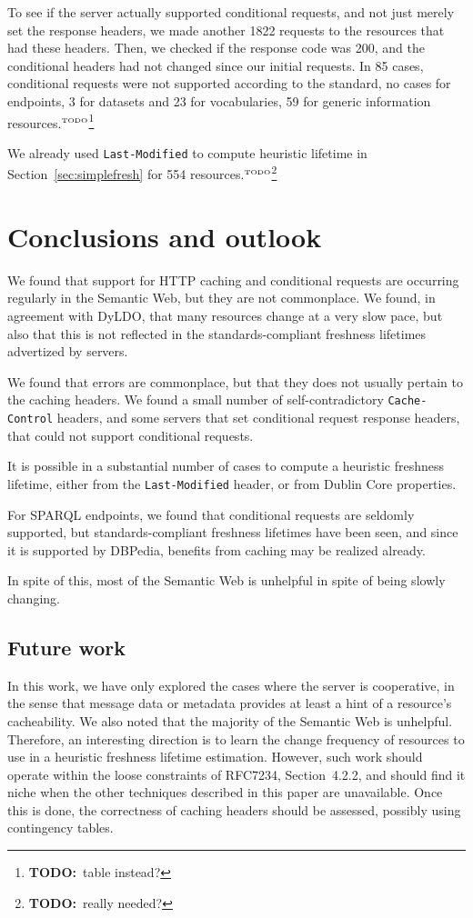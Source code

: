 \documentclass{llncs}
\newcommand{\httph}[1]{\texttt{#1}}
\newcommand{\todo}[1]{\ensuremath{^{\textrm{\tiny{TODO}\normalsize}}}\footnote{\textbf{TODO:}~#1}}
\begin{document}
To see if the server actually supported conditional requests, and not
just merely set the response headers, we made another 1822 requests to
the resources that had these headers. Then, we checked if the response
code was 200, and the conditional headers had not changed since our
initial requests. In 85 cases, conditional requests were not supported
according to the standard, no cases for endpoints, 3 for datasets and
23 for vocabularies, 59 for generic information resources.\todo{table instead?}


We already used \httph{Last-Modified} to compute heuristic lifetime
in Section~\ref{sec:simplefresh} for 554 resources.\todo{really needed?}

\section{Conclusions and outlook}

We found that support for HTTP caching and conditional requests are
occurring regularly in the Semantic Web, but they are not
commonplace. We found, in agreement with DyLDO\cite{dyldo2}, that many
resources change at a very slow pace, but also that this is not
reflected in the standards-compliant freshness lifetimes advertized by
servers.

We found that errors are commonplace, but that they does not usually
pertain to the caching headers. We found a small number of
self-contradictory \httph{Cache-Control} headers, and some servers
that set conditional request response headers, that could not support
conditional requests.

It is possible in a substantial number of cases to compute a heuristic
freshness lifetime, either from the \httph{Last-Modified} header, or
from Dublin Core properties. 

For SPARQL endpoints, we found that conditional requests are 
seldomly supported, but standards-compliant freshness lifetimes have
been seen, and since it is supported by DBPedia, benefits from caching
may be realized already.

In spite of this, most of the Semantic Web is unhelpful in spite of
being slowly changing.

\subsection{Future work}

In this work, we have only explored the cases where the server is
cooperative, in the sense that message data or metadata provides at
least a hint of a resource's cacheability. We also noted that the
majority of the Semantic Web is unhelpful. Therefore, an interesting
direction is to learn the change frequency of resources to use in a
heuristic freshness lifetime estimation. However, such work should
operate within the loose constraints of RFC7234, Section~4.2.2, and
should find it niche when the other techniques described in this paper
are unavailable. Once this is done, the correctness of caching headers
should be assessed, possibly using contingency tables.
\end{document}
